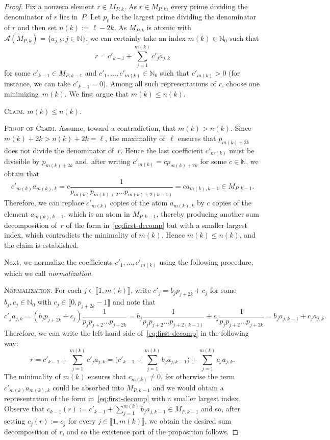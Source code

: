 \documentclass[10pt]{amsart}
\theoremstyle{definition}
\theoremstyle{remark}
\numberwithin{equation}{section}
\newcommand{\nn}{\mathbb{N}}
\providecommand\ldb{\llbracket}
\providecommand\rdb{\rrbracket}
\begin{document}
\begin{proof}
  Fix a nonzero element $r \in M_{P,k}$. As $r \in M_{P,k}$, every prime dividing the denominator of $r$ lies in~$P$. Let $p_\ell$ be the largest prime dividing the denominator of $r$ and then set $n(k) := \ell - 2k$. As $M_{P,k}$ is atomic with $\mathcal{A}(M_{P,k}) = \{a_{j,k} : j \in \nn\}$, we can certainly take an index $m(k) \in \nn_0$ such that
  \begin{equation}\label{eq:first-decomp}
    r = c'_{k-1} + \sum_{j=1}^{m(k)} c'_j a_{j,k}
  \end{equation}
  for some $c'_{k-1} \in M_{P,k-1}$ and $c'_1, \dots, c'_{m(k)} \in \nn_0$ such that $c'_{m(k)} > 0$ (for instance, we can take $c'_{k-1} = 0$). Among all such representations of $r$, choose one minimizing~$m(k)$. We first argue that $m(k) \le n(k)$.
  \smallskip

  \noindent \textsc{Claim.} $m(k) \le n(k)$.
  \smallskip

  \noindent \textsc{Proof of Claim.} Assume, toward a contradiction, that $m(k) > n(k)$. Since $m(k)+2k > n(k)+2k = \ell$, the maximality of~$\ell$ ensures that $p_{m(k) + 2k}$ does not divide the denominator of~$r$. Hence the last coefficient $c'_{m(k)}$ must be divisible by $p_{m(k)+2k}$ and, after writing $c'_{m(k)} = c p_{m(k)+2k}$ for some $c \in \nn$, we obtain that
  \[
    c'_{m(k)} a_{m(k),k} = c \frac{1}{p_{m(k)} p_{m(k)+2} \dots p_{m(k)+2(k-1)}} = c a_{m(k),k-1} \in M_{P,k-1}.
  \]
  Therefore, we can replace $c'_{m(k)}$ copies of the atom $a_{m(k),k}$ by $c$ copies of the element $a_{m(k),k-1}$, which is an atom in $M_{P,k-1}$, thereby producing another sum decomposition of~$r$ of the form in~\eqref{eq:first-decomp} but with a smaller largest index, which contradicts the minimality of $m(k)$. Hence $m(k) \le n(k)$, and the claim is established.
  \smallskip

  Next, we normalize the coefficients $c'_1, \dots, c'_{m(k)}$ using the following procedure, which we call \emph{normalization}.
  \smallskip

  \noindent \textsc{Normalization.} For each $j \in \ldb 1, m(k) \rdb$, write $c'_j = b_j p_{j+2k} + c_j$ for some $b_j, c_j \in \nn_0$ with $c_j \in \ldb 0, p_{j+2k} - 1 \rdb$ and note that
  \[
    c'_j a_{j,k} = (b_j p_{j+2k} + c_j) \frac1{p_j p_{j+2} \dots p_{j+2k}} = b_j \frac{1}{p_j p_{j+2} \dots p_{j+2(k-1)}} + c_j
    \frac{1}{p_j p_{j+2} \dots p_{j+2k}} = b_j a_{j,k-1} + c_j a_{j,k}.
  \]
  Therefore, we can write the left-hand side of~\eqref{eq:first-decomp} in the following way:
  \[
    r = c'_{k-1} + \sum_{j=1}^{m(k)} c'_j a_{j,k} = \bigg( c'_{k-1} + \sum_{j=1}^{m(k)} b_j a_{j,k-1} \bigg) + \sum_{j=1}^{m(k)} c_j a_{j,k}.
  \]
  The minimality of $m(k)$ ensures that $c_{m(k)} \neq 0$, for otherwise the term $c'_{m(k)}a_{m(k),k}$ could be absorbed into $M_{P,k-1}$ and we would obtain a representation of the form in~\eqref{eq:first-decomp} with a smaller largest index.
  Observe that $c_{k-1}(r) := c'_{k-1} + \sum_{j=1}^{m(k)} b_j a_{j,k-1} \in M_{P,k-1}$ and so, after setting $c_j(r) := c_j$ for every $j \in \ldb 1, m(k) \rdb$, we obtain the desired sum decomposition of $r$, and so the existence part of the proposition follows.
  \smallskip


\end{proof}
\end{document}
